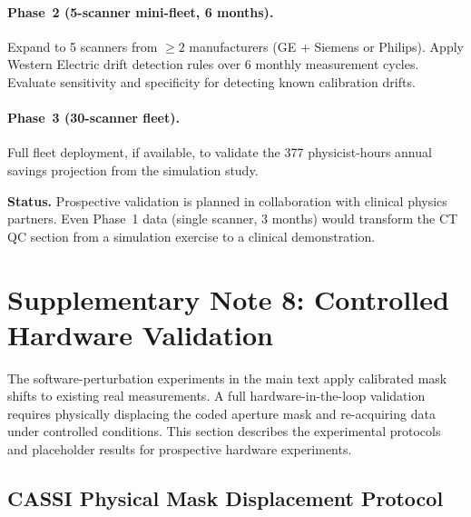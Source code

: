 \documentclass[11pt]{article}
\begin{document}
\paragraph{Phase~2 (5-scanner mini-fleet, 6 months).}
Expand to 5 scanners from $\geq 2$ manufacturers (GE + Siemens or Philips).
Apply Western Electric drift detection rules over 6 monthly measurement
cycles.  Evaluate sensitivity and specificity for detecting known
calibration drifts.

\paragraph{Phase~3 (30-scanner fleet).}
Full fleet deployment, if available, to validate the 377 physicist-hours
annual savings projection from the simulation study.

\noindent\textbf{Status.}  Prospective validation is planned in collaboration
with clinical physics partners.  Even Phase~1 data (single scanner, 3 months)
would transform the CT QC section from a simulation exercise to a clinical
demonstration.

\newpage
\section{Supplementary Note 8: Controlled Hardware Validation}
\label{sec:hardware_validation}

The software-perturbation experiments in the main text apply calibrated
mask shifts to existing real measurements.  A full hardware-in-the-loop
validation requires physically displacing the coded aperture mask and
re-acquiring data under controlled conditions.  This section describes
the experimental protocols and placeholder results for prospective
hardware experiments.

\subsection{CASSI Physical Mask Displacement Protocol}
\end{document}
